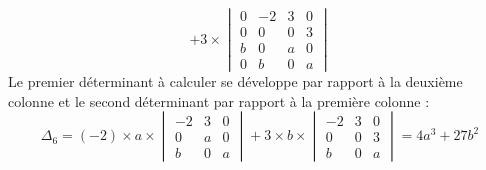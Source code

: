 {{\begin{enumerate}
$$+ 3  \times \begin{vmatrix}
0&-2&3&0 \\ 0&0&0&3 \\ b&0&a&0 \\ 0&b&0&a  
\end{vmatrix}
$$
Le premier déterminant à calculer se développe par rapport à la deuxième colonne et le second déterminant
par rapport à la première colonne :
$$\Delta_6 = (-2)\times a \times 
\begin{vmatrix}
-2&3&0 \\  0&a&0 \\ b&0&a  
\end{vmatrix}
+ 3  \times b \times 
\begin{vmatrix}
-2&3&0 \\ 0&0&3 \\ b&0&a  
\end{vmatrix}=4a^3+27b^2$$


\end{enumerate}}}
